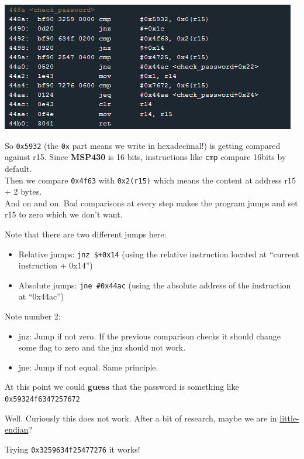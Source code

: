 \includegraphics{img/2_2.PNG}

So \texttt{0x5932} (the \texttt{0x} part means we write in hexadecimal!)
is getting compared against r15. Since \textbf{MSP430} is 16 bits,
instructions like \texttt{cmp} compare 16bits by default.\\Then we
compare \texttt{0x4f63} with \texttt{0x2(r15)} which means the content
at address r15 + 2 bytes.\\And on and on. Bad comparisons at every step
makes the program jumps and set r15 to zero which we don't want.

Note that there are two different jumps here:

\begin{itemize}
\itemsep1pt\parskip0pt
\item
  Relative jumps: \texttt{jnz \$+0x14} (using the relative instruction
  located at ``current instruction + 0x14'')
\item
  Absolute jumps: \texttt{jne \#0x44ac} (using the absolute address of
  the instruction at ``0x44ac'')
\end{itemize}

Note number 2:

\begin{itemize}
\itemsep1pt\parskip0pt
\item
  jnz: Jump if not zero. If the previous comparison checks it should
  change some flag to zero and the jnz should not work.
\item
  jne: Jump if not equal. Same principle.
\end{itemize}

At this point we could \textbf{guess} that the password is something
like \texttt{0x59324f6347257672}

Well. Curiously this does not work. After a bit of research, maybe we
are in \href{http://en.wikipedia.org/wiki/Endianness}{little-endian}?

Trying \texttt{0x3259634f25477276} it works!

